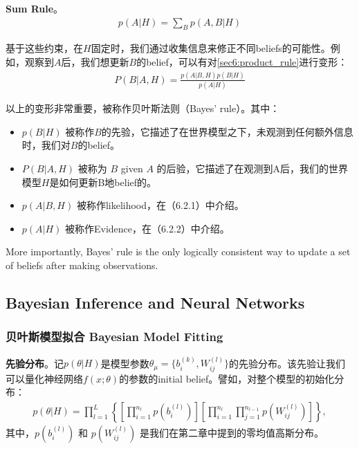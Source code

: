 \textbf{Sum Rule}。
\begin{equation}
    \begin{split}
    p(A|H) = \sum_{B}{p(A,B|H)}
    \end{split}
\end{equation}


基于这些约束，在$H$固定时，我们通过收集信息来修正不同beliefs的可能性。例如，观察到$A$后，我们想更新$B$的belief，可以有对\eqref{sec6:product_rule}进行变形：
\begin{equation}
    \begin{split}
    P(B|A,H) =  \frac{p(A|B,H)p(B|H)}{p(A|H)}
    \end{split}
\end{equation}

以上的变形非常重要，被称作贝叶斯法则（Bayes' rule）。其中：
\begin{itemize}
    \item $p(B|H)$ 被称作$B$的先验，它描述了在世界模型之下，未观测到任何额外信息时，我们对$B$的belief。
    \item $P(B|A,H)$ 被称为 $B$ given $A$ 的后验，它描述了在观测到A后，我们的世界模型$H$是如何更新B地belief的。
    \item $p(A|B,H)$ 被称作likelihood，在（6.2.1）中介绍。
    \item $p(A|H)$ 被称作Evidence，在（6.2.2）中介绍。
\end{itemize}

More importantly, Bayes’ rule is the only logically consistent way to update a set of beliefs after making observations.


\subsection{Bayesian Inference and Neural Networks}
\subsubsection{贝叶斯模型拟合 Bayesian Model Fitting}

\textbf{先验分布}。记$p(\theta|H)$是模型参数$\theta_\mu=\{b_i^{(k)}, W_{ij}^{(l)}\}$的先验分布。该先验让我们可以量化神经网络$f(x;\theta)$的参数的initial belief。譬如，对整个模型的初始化分布：
\begin{equation}
    \begin{split}
    p(\theta|H) = \prod_{l=1}^{L} \left\{
        \left[ \prod_{i=1}^{n_l} p\left(b_i^{(l)}\right) \right]
        \left[ \prod_{i=1}^{n_l} \prod_{j=1}^{n_{l-1}}p\left(W_{ij}^{(l)}\right)\right]
    \right\},
    \end{split}
\end{equation}
其中，$p\left(b_i^{(l)}\right)$ 和 $p\left(W_{ij}^{(l)}\right)$ 是我们在第二章中提到的零均值高斯分布。

